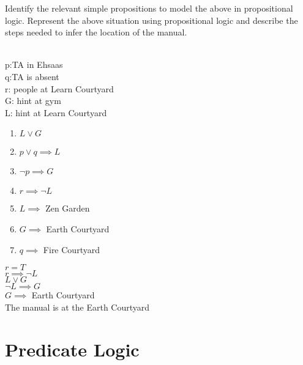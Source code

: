 \documentclass[addpoints]{exam}
\begin{document}
\begin{questions}
  Identify the relevant simple propositions to model the above in propositional logic. Represent the above situation using propositional logic and describe the steps needed to infer the location of the manual.
  \begin{solution}
  \\p:TA in Ehsaas
    \\q:TA is absent
    \\r: people at Learn Courtyard
    \\G: hint at gym
    \\L: hint at Learn Courtyard
    \begin{enumerate}
    \item $L \lor G$
    \item $p \lor q \implies L$
    \item $\neg p \implies G$
    \item $r \implies \neg L$
    \item $L \implies$ Zen Garden
    \item $G \implies$ Earth Courtyard
    \item $q \implies$ Fire Courtyard
    \end{enumerate}
    $r=T$
    \\$r \implies \neg L$
    \\$L \lor G$
    \\$\neg L \implies G$
    \\$G \implies$ Earth Courtyard
    \\The manual is at the Earth Courtyard
    
  
  \end{solution}

\section*{Predicate Logic}
  
\question
\end{questions}
\end{document}
